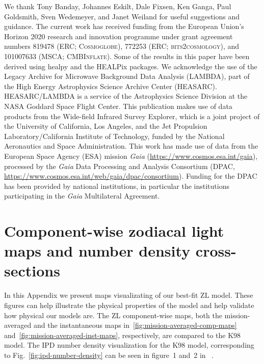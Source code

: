 \documentclass[twocolumn]{aa}
\begin{document}
\begin{acknowledgements}
  We thank Tony Banday, Johannes Eskilt, Dale Fixsen, Ken Ganga, Paul
  Goldsmith, Sven Wedemeyer, and Janet Weiland for useful suggestions
  and guidance.  The current work has received funding from the
  European Union’s Horizon 2020 research and innovation programme
  under grant agreement numbers 819478 (ERC; \textsc{Cosmoglobe}),
  772253 (ERC; \textsc{bits2cosmology}), and 101007633 (MSCA;
  \textsc{CMBInflate}).  Some of the results in this paper have been
  derived using healpy \citep{Zonca2019} and the HEALPix
  \citep{healpix} packages.  We acknowledge the use of the Legacy
  Archive for Microwave Background Data Analysis (LAMBDA), part of the
  High Energy Astrophysics Science Archive Center
  (HEASARC). HEASARC/LAMBDA is a service of the Astrophysics Science
  Division at the NASA Goddard Space Flight Center. This publication
  makes use of data products from the Wide-field Infrared Survey
  Explorer, which is a joint project of the University of California,
  Los Angeles, and the Jet Propulsion Laboratory/California Institute
  of Technology, funded by the National Aeronautics and Space
  Administration. This work has made use of data from the European
  Space Agency (ESA) mission {\it Gaia}
  (\url{https://www.cosmos.esa.int/gaia}), processed by the {\it Gaia}
  Data Processing and Analysis Consortium (DPAC,
  \url{https://www.cosmos.esa.int/web/gaia/dpac/consortium}). Funding
  for the DPAC has been provided by national institutions, in
  particular the institutions participating in the {\it Gaia}
  Multilateral Agreement.
\end{acknowledgements}


%



%

\appendix
\onecolumn

\section{Component-wise zodiacal light maps and number density cross-sections}
\label{sec:zodi-comps}

In this Appendix we present maps visualizating of our best-fit ZL 
model. These figures can help illustrate the physical properties 
of the model and help validate how physical our models are. The ZL 
component-wise maps, both the mission-averaged and the instantaneous maps 
in~\ref{fig:mission-averaged-comp-maps} 
and~\ref{fig:mission-averaged-inst-maps}, respectively, are compared to 
the K98 model. The IPD number density visualization for the K98 model, 
corresponding to Fig.~\ref{fig:ipd-number-density} can be seen in 
figure~1 and~2 in~\cite{San2022} .
\end{document}
